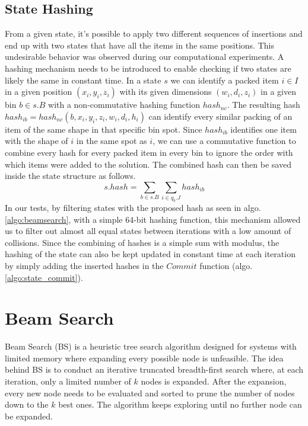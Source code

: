 \subsection{State Hashing}
\label{sec:state_uniqueness}%
From a given state, it's possible to apply two different sequences of insertions and end up with two states that have all the items in the same positions.
This undesirable behavior was observed during our computational experiments.
A hashing mechanism needs to be introduced to enable checking if two states are likely the same in constant time.
In a state $s$ we can identify a packed item $i \in I$ in a given position $(x_i, y_i, z_i)$ with its given dimensions $(w_i, d_i, z_i)$ in a given bin $b \in s.B$ with a non-commutative hashing function $hash_{nc}$. 
The resulting hash $hash_{ib} = hash_{nc}(b, x_i, y_i, z_i, w_i, d_i, h_i)$ can identify every similar packing of an item of the same shape in that specific bin spot.
Since $hash_{ib}$ identifies one item with the shape of $i$ in the same spot as $i$, we can use a commutative function to combine every hash for every packed item in every bin to ignore the order with which items were added to the solution.
The combined hash can then be saved inside the state structure as follows. 
\begin{equation}
    s.hash = \sum\limits_{b \in s.B}{\sum\limits_{i \in q_b.J}{hash_{ib}}}
\end{equation}
In our tests, by filtering states with the proposed hash as seen in algo. \ref{algo:beamsearch}, with a simple 64-bit hashing function, this mechanism allowed us to filter out almost all equal states between iterations with a low amount of collisions.
Since the combining of hashes is a simple sum with modulus, the hashing of the state can also be kept updated in constant time at each iteration by simply adding the inserted hashes in the $Commit$ function (algo. \ref{algo:state_commit}).

\section{Beam Search}
\label{sec:beamsearch}%
Beam Search (BS) is a heuristic tree search algorithm designed for systems with limited memory where expanding every possible node is unfeasible.
The idea behind BS is to conduct an iterative truncated breadth-first search where, at each iteration, only a limited number of $k$ nodes is expanded.
After the expansion, every new node needs to be evaluated and sorted to prune the number of nodes down to the $k$ best ones. The algorithm keeps exploring until no further node can be expanded.

